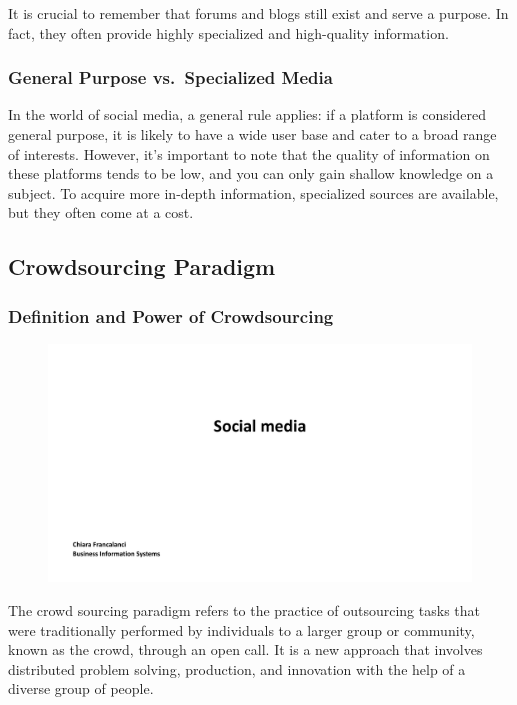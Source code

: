 It is crucial to remember that forums and blogs still exist and serve a
purpose. In fact, they often provide highly specialized and high-quality
information.

\subsubsection{General Purpose vs.~Specialized
    Media}\label{general-purpose-vs.-specialized-media}

In the world of social media, a general rule applies: if a platform is
considered general purpose, it is likely to have a wide user base and
cater to a broad range of interests. However, it's important to note
that the quality of information on these platforms tends to be low, and
you can only gain shallow knowledge on a subject. To acquire more
in-depth information, specialized sources are available, but they often
come at a cost.

\subsection{Crowdsourcing Paradigm}\label{crowdsourcing-paradigm}

\subsubsection{Definition and Power of
    Crowdsourcing}\label{definition-and-power-of-crowdsourcing}

\begin{figure}[!h]
    \centering
    \includegraphics[page=6, trim = 1.5cm 5cm 3cm 4cm, clip, width=\textwidth]{images/04 - Social_Media.pdf}
\end{figure}

The crowd sourcing paradigm refers to the practice of outsourcing tasks
that were traditionally performed by individuals to a larger group or
community, known as the crowd, through an open call. It is a new
approach that involves distributed problem solving, production, and
innovation with the help of a diverse group of people.

